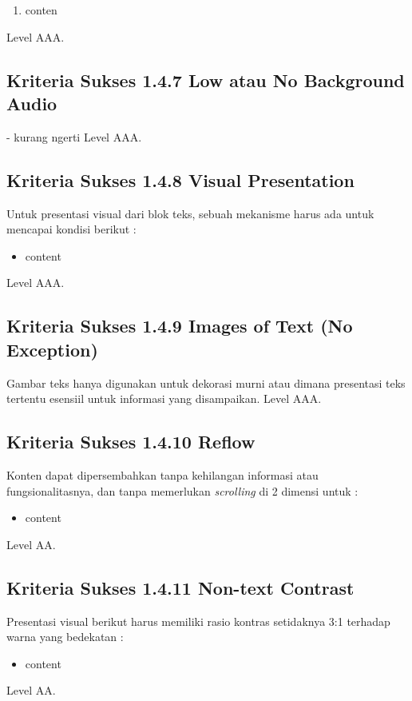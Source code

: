 \begin{enumerate}
	\item conten
\end{enumerate}
Level AAA.

\subsection{Kriteria Sukses 1.4.7 Low atau No Background Audio}
\label{sec:kriteria_1.4.7}
- kurang ngerti
Level AAA.

\subsection{Kriteria Sukses 1.4.8 Visual Presentation}
\label{sec:kriteria_1.4.8}
Untuk presentasi visual dari blok teks, sebuah mekanisme harus ada untuk mencapai kondisi berikut :

\begin{itemize}
	\item content	
\end{itemize}
Level AAA.

\subsection{Kriteria Sukses 1.4.9 Images of Text (No Exception)}
\label{sec:kriteria_1.4.9}
Gambar teks hanya digunakan untuk dekorasi murni atau dimana presentasi teks tertentu esensiil untuk informasi yang disampaikan. 
Level AAA.

\subsection{Kriteria Sukses 1.4.10 Reflow}
\label{sec:kriteria_1.4.10}
Konten dapat dipersembahkan tanpa kehilangan informasi atau fungsionalitasnya, dan tanpa memerlukan \textit{scrolling} di 2 dimensi untuk :

\begin{itemize}
	\item content
\end{itemize}
Level AA.

\subsection{Kriteria Sukses 1.4.11 Non-text Contrast}
\label{sec:kriteria_1.4.11}
Presentasi visual berikut harus memiliki rasio kontras setidaknya 3:1 terhadap warna yang bedekatan :

\begin{itemize}
	\item content
\end{itemize}
Level AA.


